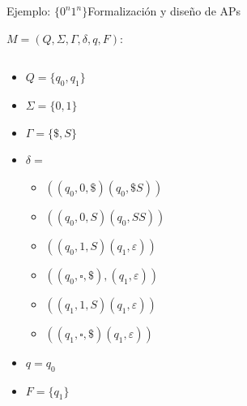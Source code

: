\documentclass[spanish]{beamer}
\begin{document}
\begin{frame}{Ejemplo: $\{0^n1^n\}$}{Formalización y diseño de APs}

    $M = (Q, \Sigma, \Gamma, \delta, q, F)$:

    \begin{columns}
        \begin{column}{0.4\textwidth}
            \begin{itemize}
                \item $Q = \{q_0, q_1\}$
                \item $\Sigma = \{0, 1\}$
                \item $\Gamma = \{\$, S\}$
                \item $\delta =$
                \begin{itemize}
                    \item $((q_0,0,\$)(q_0,\$S))$
                    \item $((q_0,0,S)(q_0,SS))$
                    \item $((q_0,1,S)(q_1,\varepsilon))$
                    \item $((q_0,\square,\$),(q_1,\varepsilon))$
                    \item $((q_1,1,S)(q_1,\varepsilon))$
                    \item $((q_1,\square,\$)(q_1,\varepsilon))$
                \end{itemize}
                \item $q = q_0$
                \item $F = \{q_1\}$
            \end{itemize}
        \end{column}
        \begin{column}{0.6\textwidth}
        \end{column}
    \end{columns}
\end{frame}
\end{document}
